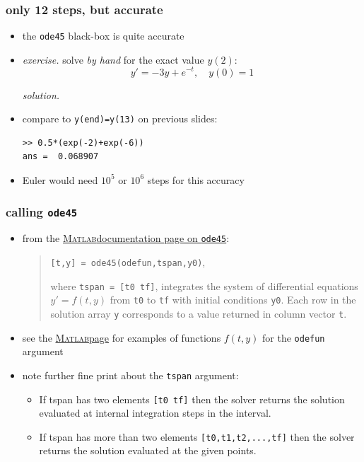 \documentclass[dvipsnames,colorlinks]{beamer}
\newcommand{\Matlab}{\textsc{Matlab}}
\begin{document}
\begin{frame}[fragile]
\frametitle{only 12 steps, but accurate}

\begin{itemize}
\item the \texttt{ode45} black-box is quite accurate
\item \emph{exercise.} solve \emph{by hand} for the exact value $y(2)$:
    $$y' = - 3 y + e^{-t}, \quad y(0)=1$$

\noindent \emph{solution.}

\vspace{30mm}
\item compare to \texttt{y(end)=y(13)} on previous slides:

\begin{Verbatim}
>> 0.5*(exp(-2)+exp(-6))
ans =  0.068907
\end{Verbatim}
\item Euler would need $10^5$ or $10^6$ steps for this accuracy
\end{itemize}
\end{frame}


\begin{frame}[fragile]
\frametitle{calling \texttt{ode45}}

\begin{itemize}
\item from the \href{https://www.mathworks.com/help/matlab/ref/ode45.html}{\Matlab documentation page on \texttt{ode45}}:

\medskip
\begin{quote}\normalfont
\texttt{[t,y] = ode45(odefun,tspan,y0)},

\medskip
where \texttt{tspan = [t0 tf]}, integrates the system of differential equations $y'=f(t,y)$ from \texttt{t0} to \texttt{tf} with initial conditions \texttt{y0}. Each row in the solution array \texttt{y} corresponds to a value returned in column vector \texttt{t}.
\end{quote}
\item see the \href{https://www.mathworks.com/help/matlab/ref/ode45.html}{\Matlab page} for examples of functions $f(t,y)$ for the \texttt{odefun} argument
\item note further fine print about the \texttt{tspan} argument:
   \begin{itemize}
   \footnotesize
   \item If tspan has two elements \texttt{[t0 tf]} then the solver returns the solution evaluated at internal integration steps in the interval.
   \item If tspan has more than two elements \texttt{[t0,t1,t2,...,tf]} then the solver returns the solution evaluated at the given points.
   \end{itemize}
\end{itemize}
\end{frame}
\end{document}
